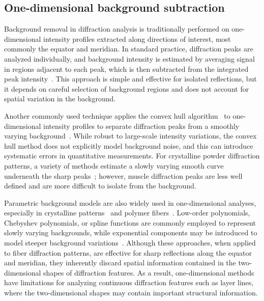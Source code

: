 \documentclass[11pt,onecolumn]{IEEEtran}
\begin{document}
\subsection{One-dimensional background subtraction}

Background removal in diffraction analysis is traditionally performed on one-dimensional intensity profiles extracted along directions of interest, most commonly the equator and meridian. In standard practice, diffraction peaks are analyzed individually, and background intensity is estimated by averaging signal in regions adjacent to each peak, which is then subtracted from the integrated peak intensity~\cite{NederKorsunskiy2018}. This approach is simple and effective for isolated reflections, but it depends on careful selection of background regions and does not account for spatial variation in the background.

Another commonly used technique applies the convex hull algorithm~\cite{jarvis1973convex_hull} to one-dimensional intensity profiles to separate diffraction peaks from a smoothly varying background~\cite{lee2019musclex}. While robust to large-scale intensity variations, the convex hull method does not explicitly model background noise, and this can introduce systematic errors in quantitative measurements. For crystalline powder diffraction patterns, a variety of methods estimate a slowly varying smooth curve underneath the sharp peaks~\cite{bruckner2000background, PolarBackground2024, ning2014beads, baek2015baseline, prescher2015dioptas}; however, muscle diffraction peaks are less well defined and are more difficult to isolate from the background.


Parametric background models are also widely used in one-dimensional analyses, especially in crystalline patterns~\cite{toby2013gsas2} and polymer fibers~\cite{grubb1992high_modulus_pe_fiber}. Low-order polynomials, Chebyshev polynomials, or spline functions are commonly employed to represent slowly varying backgrounds, while exponential components may be introduced to model steeper background variations~\cite{rajkumar2007fibrefix}. Although these approaches, when applied to fiber diffraction patterns, are effective for sharp reflections along the equator and meridian, they inherently discard spatial information contained in the two-dimensional shapes of diffraction features. As a result, one-dimensional methods have limitations for analyzing continuous diffraction features such as layer lines, where the two-dimensional shapes may contain important structural information.
\end{document}
